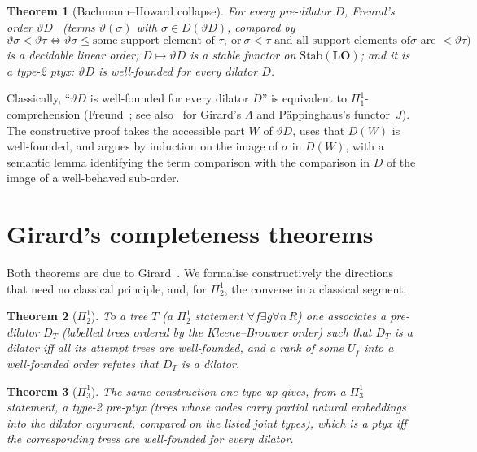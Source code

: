 \documentclass[11pt]{article}
\newtheorem{theorem}{Theorem}[section]
\theoremstyle{definition}
\theoremstyle{remark}
\newcommand{\Stab}{\mathrm{Stab}}
\newcommand{\LO}{\mathbf{LO}}
\begin{document}
\begin{theorem}[Bachmann--Howard collapse]
For every pre-dilator $D$, Freund's order $\vartheta D$~\cite{Fre19} (terms
$\vartheta(\sigma)$ with $\sigma\in D(\vartheta D)$, compared by
\[\vartheta\sigma<\vartheta\tau\iff \vartheta\sigma\le\text{some support
element of }\tau,\ \text{or}\ \sigma<\tau\text{ and all support elements of
}\sigma\text{ are }<\vartheta\tau)\]
is a decidable linear order; $D\mapsto\vartheta D$ is a stable functor on
$\Stab(\LO)$; and it is a type-2 ptyx: $\vartheta D$ is well-founded for
every dilator $D$.
\end{theorem}

Classically, ``$\vartheta D$ is well-founded for every dilator $D$'' is
equivalent to $\Pi^1_1$-comprehension (Freund~\cite{Fre19}; see
also~\cite{AFW} for Girard's $\Lambda$ and P\"appinghaus's functor~$J$). The constructive proof
takes the accessible part $W$ of $\vartheta D$, uses that $D(W)$ is
well-founded, and argues by induction on the image of $\sigma$ in $D(W)$,
with a semantic lemma identifying the term comparison with the comparison
in $D$ of the image of a well-behaved sub-order.

\section{Girard's completeness theorems}\label{sec:girard}

Both theorems are due to Girard~\cite{Gir81,GirPTLC}. We formalise
constructively the directions that need no classical principle, and, for
$\Pi^1_2$, the converse in a classical segment.

\begin{theorem}[$\Pi^1_2$]
To a tree $T$ (a $\Pi^1_2$ statement $\forall f\exists g\forall n\,R$)
one associates a pre-dilator $D_T$ (labelled trees ordered by the
Kleene--Brouwer order) such that $D_T$ is a dilator iff all its attempt
trees are well-founded, and a rank of some $U_f$ into a well-founded order
refutes that $D_T$ is a dilator.
\end{theorem}

\begin{theorem}[$\Pi^1_3$]
The same construction one type up gives, from a $\Pi^1_3$ statement, a
type-2 pre-ptyx (trees whose nodes carry partial natural embeddings into
the dilator argument, compared on the listed joint types), which is a ptyx
iff the corresponding trees are well-founded for every dilator.
\end{theorem}
\end{document}

